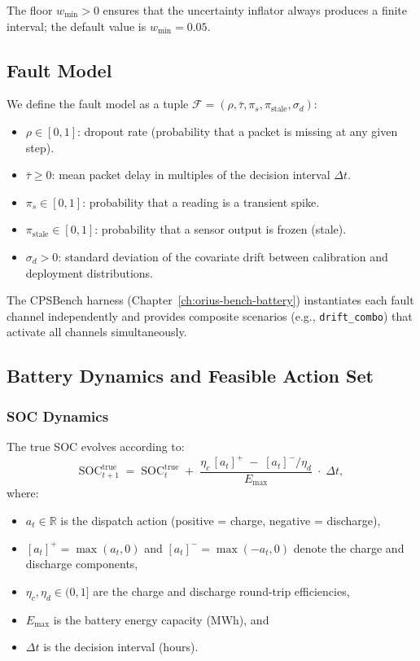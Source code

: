 The floor $w_{\min} > 0$ ensures that the uncertainty inflator always
produces a finite interval; the default value is $w_{\min} = 0.05$.

\subsection{Fault Model}
\label{sec:fault-model}

We define the fault model as a tuple
$\mathcal{F} = (\rho, \bar{\tau}, \pi_s, \pi_{\mathrm{stale}}, \sigma_d)$:

\begin{itemize}
  \item $\rho \in [0, 1]$: dropout rate (probability that a packet is
    missing at any given step).
  \item $\bar{\tau} \ge 0$: mean packet delay in multiples of the
    decision interval $\Delta t$.
  \item $\pi_s \in [0, 1]$: probability that a reading is a transient
    spike.
  \item $\pi_{\mathrm{stale}} \in [0, 1]$: probability that a sensor
    output is frozen (stale).
  \item $\sigma_d > 0$: standard deviation of the covariate drift between
    calibration and deployment distributions.
\end{itemize}

The CPSBench harness (Chapter~\ref{ch:orius-bench-battery}) instantiates
each fault channel independently and provides composite scenarios
(e.g., \texttt{drift\_combo}) that activate all channels simultaneously.

\subsection{Battery Dynamics and Feasible Action Set}
\label{sec:battery-dynamics}

\subsubsection{SOC Dynamics}

The true SOC evolves according to:
\begin{equation}
\label{eq:soc-dynamics}
  \mathrm{SOC}_{t+1}^{\mathrm{true}} \;=\;
  \mathrm{SOC}_t^{\mathrm{true}}
  \;+\; \frac{\eta_c\,[a_t]^{+} \;-\; [a_t]^{-}/\eta_d}{E_{\max}}
  \;\cdot\; \Delta t,
\end{equation}
where:
\begin{itemize}
  \item $a_t \in \mathbb{R}$ is the dispatch action (positive = charge,
    negative = discharge),
  \item $[a_t]^{+} = \max(a_t, 0)$ and $[a_t]^{-} = \max(-a_t, 0)$
    denote the charge and discharge components,
  \item $\eta_c, \eta_d \in (0, 1]$ are the charge and discharge
    round-trip efficiencies,
  \item $E_{\max}$ is the battery energy capacity (MWh), and
  \item $\Delta t$ is the decision interval (hours).
\end{itemize}

